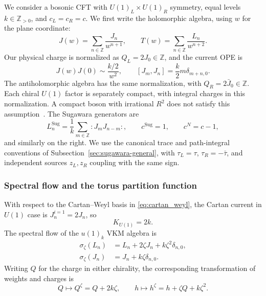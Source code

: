 \documentclass[11pt]{article}
\numberwithin{equation}{section}
\begin{document}
We consider a bosonic CFT with $U(1)_L\times U(1)_R$ symmetry, equal levels $k\in\mathbb Z_{>0}$, and $c_L=c_R=c$. We first write the holomorphic algebra, using $w$ for the plane coordinate:
\begin{equation}
J(w)=\sum_{n\in\mathbb Z}\frac{J_n}{w^{n+1}},
\qquad T(w)=\sum_{n\in\mathbb Z}\frac{L_n}{w^{n+2}}.
\label{eq:u1-mode-expansion}
\end{equation}
Our physical charge is normalized as $Q_L=2J_0\in\mathbb Z$, and the current OPE is
\begin{equation}
J(w)J(0)\sim\frac{k/2}{w^2},
\qquad [J_m,J_n]=\frac{k}{2}m\delta_{m+n,0}.
\label{eq:u1-current-ope}
\end{equation}
The antiholomorphic algebra has the same normalization, with $Q_R=2\bar J_0\in\mathbb Z$. Each chiral $U(1)$ factor is separately compact, with integral charges in this normalization. A compact boson with irrational $R^2$ does not satisfy this assumption~\cite{Benjamin:2020swg}. The Sugawara generators are
\begin{equation}
L_n^{\mathrm{Sug}}=\frac1k\sum_{m\in\mathbb Z}:J_mJ_{n-m}:,
\qquad c^{\mathrm{Sug}}=1,
\qquad c^N=c-1,
\end{equation}
and similarly on the right. We use the canonical trace and path-integral conventions of Subsection~\ref{sec:sugawara-general}, with $\tau_L=\tau$, $\tau_R=-\bar\tau$, and independent sources $z_L,z_R$ coupling with the same sign.

\subsubsection{Spectral flow and the torus partition function}
\label{sec:U1-spectral-flow}

With respect to the Cartan–Weyl basis in \eqref{eq:cartan_weyl}, the Cartan current in $U(1)$ case is $J_n^{i=1}=2J_n$, so
\begin{equation}
 K_{U(1)}=2k.
\end{equation}
The spectral flow of the $u(1)_k$ VKM algebra is
\begin{align}
\sigma_\zeta(L_n)&=L_n+2\zeta J_n+k\zeta^2\delta_{n,0},
\label{eq:u1-spectral-flow-algebra_1}\\
\sigma_\zeta(J_n)&=J_n+k\zeta\delta_{n,0}.
\label{eq:u1-spectral-flow-algebra_2}
\end{align}
Writing $Q$ for the charge in either chirality, the corresponding transformation of weights and charges is
\begin{equation}
Q\longmapsto Q^\zeta=Q+2k\zeta,
\qquad h\longmapsto h^\zeta=h+\zeta Q+k\zeta^2.
\label{spectral-flow-state}
\end{equation}
\end{document}
